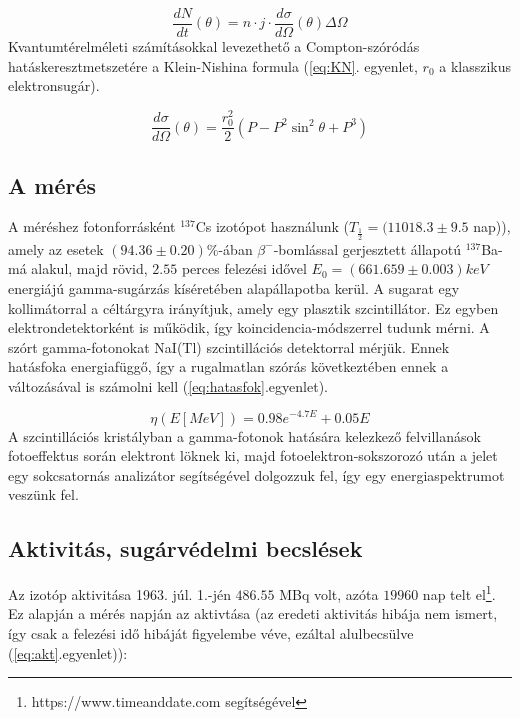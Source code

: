 \documentclass[a4paper,12pt]{article}
\begin{document}
\begin{equation}
	\frac{dN}{dt}(\theta) = n \cdot j \cdot\frac{d\sigma}{d\Omega}(\theta)\Delta\Omega
	\label{eq:diff_hkm}
\end{equation}
Kvantumtérelméleti számításokkal levezethető a Compton-szóródás hatáskeresztmetszetére a Klein-Nishina formula (\ref{eq:KN}. egyenlet, $r_0$ a klasszikus elektronsugár).

\begin{equation}
	\frac{d\sigma}{d\Omega}(\theta) = \frac{r_0^2}{2}(P-P^2\sin^2{\theta}+P^3)
	\label{eq:KN}
\end{equation}

\subsection*{A mérés}
A méréshez fotonforrásként $^{137}$Cs izotópot használunk ($T_\frac{1}{2}=(11018.3\pm9.5$ nap)), amely az esetek $(94.36\pm 0.20)\%$-ában $\beta^-$-bomlással gerjesztett állapotú $^{137}$Ba-má alakul, majd rövid, $2.55$ perces felezési idővel $E_0=(661.659\pm0.003)keV$ energiájú gamma-sugárzás kíséretében alapállapotba kerül. A sugarat egy kollimátorral a céltárgyra irányítjuk, amely egy plasztik szcintillátor. Ez egyben elektrondetektorként is működik, így koincidencia-módszerrel tudunk mérni. A szórt gamma-fotonokat NaI(Tl) szcintillációs detektorral mérjük. Ennek hatásfoka energiafüggő, így a rugalmatlan szórás következtében ennek a változásával is számolni kell (\ref{eq:hatasfok}.egyenlet).

\begin{equation}
	\eta(E[MeV])=0.98e^{-4.7E}+0.05E
	\label{eq:hatasfok}
\end{equation}
A szcintillációs kristályban a gamma-fotonok hatására kelezkező felvillanások fotoeffektus során elektront löknek ki, majd fotoelektron-sokszorozó után a jelet egy sokcsatornás analizátor segítségével dolgozzuk fel, így egy energiaspektrumot veszünk fel. 


\subsection*{Aktivitás, sugárvédelmi becslések}
Az izotóp aktivitása 1963. júl. 1.-jén $486.55$ MBq volt, azóta $19 960$ nap telt el\footnote{https://www.timeanddate.com segítségével}. Ez alapján a mérés napján az aktivtása (az eredeti aktivitás hibája nem ismert, így csak a felezési idő hibáját figyelembe véve, ezáltal alulbecsülve (\ref{eq:akt}.egyenlet)):
\end{document}
